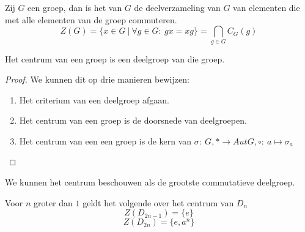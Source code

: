 \documentclass[main.tex]{subfiles}
\begin{document}
\begin{de}
  \label{de:centrum}
  Zij $G$ een groep, dan is het  van $G$ de deelverzameling van $G$ van elementen die met alle elementen van de groep commuteren.
  \[ Z(G) = \{ x \in G\ |\ \forall g \in G:\ gx = xg\} = \bigcap_{g \in G}C_{G}(g) \]
\end{de}

\begin{ei}
  \label{ei:centrum-is-deelgroep}
  Het centrum van een groep is een deelgroep van die groep.

  \begin{proof}
    We kunnen dit op drie manieren bewijzen:
    \begin{enumerate}
    \item Het criterium van een deelgroep afgaan.
    \item Het centrum van een groep is de doorsnede van deelgroepen. 
    \item Het centrum van een een groep is de kern van $\sigma:\ G,* \rightarrow Aut G,\circ:\ a \mapsto \sigma_{a}$
    \end{enumerate}
  \end{proof}
\end{ei}

\begin{opm}
  We kunnen het centrum beschouwen als de grootste commutatieve deelgroep.
\end{opm}

\begin{st}
  Voor $n$ groter dan $1$ geldt het volgende over het centrum van $D_{n}$
  \[ Z(D_{2n-1}) = \{e\} \]
  \[ Z(D_{2n}) = \{e,a^{n}\} \]
  
\end{st}
\end{document}
